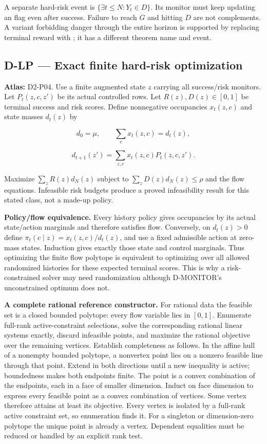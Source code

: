 \documentclass[
  11pt,
  a4paper,
]{article}
\newcommand{\codewrap}[1]{{\ttfamily\seqsplit{#1}}}
\begin{document}
A separate hard-risk event is \(\{\exists t\le N:Y_t\in D\}\). Its
monitor must keep updating an \codewrap{ever\_danger} flag even after
success. Failure to reach \(G\) and hitting \(D\) are not complements. A
variant forbidding danger through the entire horizon is supported by
replacing terminal reward with \codewrap{success\ AND\ NOT\ ever\_danger};
it has a different theorem name and event.

\subsection{D-LP --- Exact finite hard-risk
optimization}\label{d-lp-exact-finite-hard-risk-optimization}

\textbf{Atlas:} D2-P04. Use a finite augmented state \(z\) carrying all
success/risk monitors. Let \(P_t(z,c,z')\) be its actual controlled
rows. Let \(R(z),D(z)\in[0,1]\) be terminal success and risk scores.
Define nonnegative occupancies \(x_t(z,c)\) and state masses \(d_t(z)\)
by

\[d_0=\mu,\qquad \sum_cx_t(z,c)=d_t(z),\]

\[d_{t+1}(z')=\sum_{z,c}x_t(z,c)P_t(z,c,z').\]

Maximize \(\sum_zR(z)d_N(z)\) subject to \(\sum_zD(z)d_N(z)\le\rho\) and
the flow equations. Infeasible risk budgets produce a proved
infeasibility result for this stated class, not a made-up policy.

\textbf{Policy/flow equivalence.} Every history policy gives occupancies
by its actual state/action marginals and therefore satisfies flow.
Conversely, on \(d_t(z)>0\) define \(\pi_t(c\mid z)=x_t(z,c)/d_t(z)\),
and use a fixed admissible action at zero-mass states. Induction gives
exactly those state and control marginals. Thus optimizing the finite
flow polytope is equivalent to optimizing over all allowed randomized
histories for these expected terminal scores. This is why a
risk-constrained solver may need randomization although D-MONITOR's
unconstrained optimum does not.

\textbf{A complete rational reference constructor.} For rational data
the feasible set is a closed bounded polytope: every flow variable lies
in \([0,1]\). Enumerate full-rank active-constraint selections, solve
the corresponding rational linear systems exactly, discard infeasible
points, and maximize the rational objective over the remaining vertices.
Establish completeness as follows. In the affine hull of a nonempty
bounded polytope, a nonvertex point lies on a nonzero feasible line
through that point. Extend in both directions until a new inequality is
active; boundedness makes both endpoints finite. The point is a convex
combination of the endpoints, each in a face of smaller dimension.
Induct on face dimension to express every feasible point as a convex
combination of vertices. Some vertex therefore attains at least its
objective. Every vertex is isolated by a full-rank active constraint
set, so enumeration finds it. For a singleton or dimension-zero polytope
the unique point is already a vertex. Dependent equalities must be
reduced or handled by an explicit rank test.
\end{document}
